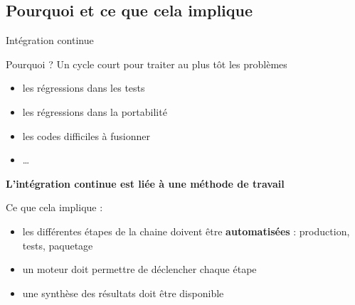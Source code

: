 \documentclass[9pt]{beamer}
\begin{document}
\subsection{Pourquoi et ce que cela implique}
\begin{frame}{Intégration continue}

  \begin{block}{Pourquoi ?}
    Un cycle court pour traiter au plus tôt les problèmes
    \begin{itemize}
    \item les régressions dans les tests
    \item les régressions dans la portabilité
    \item les codes difficiles à fusionner
    \item \dots
  \end{itemize}

  \textbf{L'intégration continue est liée à une méthode de travail}

\end{block}

\begin{block}{Ce que cela implique :}
\begin{itemize}
\item les différentes étapes de la chaine doivent être \textbf{automatisées} : production, tests, paquetage
\item un moteur doit permettre de déclencher chaque étape
\item une synthèse des résultats doit être disponible
\end{itemize}
\end{block}
\end{frame}
\end{document}
